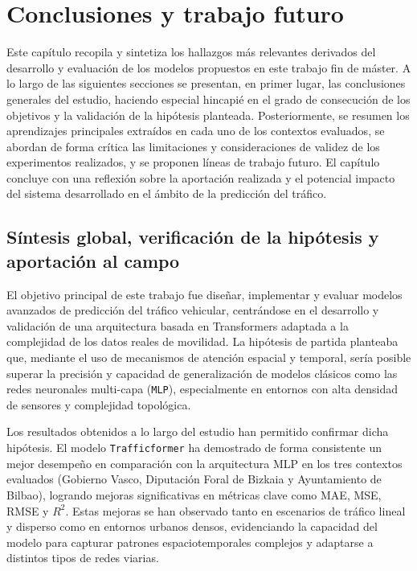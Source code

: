 \section{Conclusiones y trabajo futuro}
\label{sec:conclusiones}

%
%

Este capítulo recopila y sintetiza los hallazgos más relevantes derivados del desarrollo y evaluación de los modelos propuestos en este trabajo fin de máster. A lo largo de las siguientes secciones se presentan, en primer lugar, las conclusiones generales del estudio, haciendo especial hincapié en el grado de consecución de los objetivos y la validación de la hipótesis planteada. Posteriormente, se resumen los aprendizajes principales extraídos en cada uno de los contextos evaluados, se abordan de forma crítica las limitaciones y consideraciones de validez de los experimentos realizados, y se proponen líneas de trabajo futuro. El capítulo concluye con una reflexión sobre la aportación realizada y el potencial impacto del sistema desarrollado en el ámbito de la predicción del tráfico.

\subsection{Síntesis global, verificación de la hipótesis y aportación al campo}
\label{sec:sintesis_verif}

El objetivo principal de este trabajo fue diseñar, implementar y evaluar modelos avanzados de predicción del tráfico vehicular, centrándose en el desarrollo y validación de una arquitectura basada en Transformers adaptada a la complejidad de los datos reales de movilidad. La hipótesis de partida planteaba que, mediante el uso de mecanismos de atención espacial y temporal, sería posible superar la precisión y capacidad de generalización de modelos clásicos como las redes neuronales multi-capa (\texttt{MLP}), especialmente en entornos con alta densidad de sensores y complejidad topológica.

Los resultados obtenidos a lo largo del estudio han permitido confirmar dicha hipótesis. El modelo \texttt{Trafficformer} ha demostrado de forma consistente un mejor desempeño en comparación con la arquitectura MLP en los tres contextos evaluados (Gobierno Vasco, Diputación Foral de Bizkaia y Ayuntamiento de Bilbao), logrando mejoras significativas en métricas clave como MAE, MSE, RMSE y $R^2$. Estas mejoras se han observado tanto en escenarios de tráfico lineal y disperso como en entornos urbanos densos, evidenciando la capacidad del modelo para capturar patrones espaciotemporales complejos y adaptarse a distintos tipos de redes viarias.

